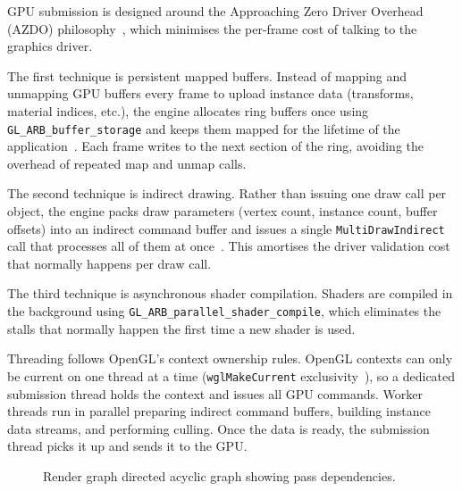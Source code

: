 \documentclass[9pt,openany]{extbook}
\begin{document}
GPU submission is designed around the Approaching Zero Driver Overhead (AZDO) philosophy~\cite{azdo_khronos}, which minimises the per-frame cost of talking to the graphics driver.

The first technique is persistent mapped buffers. Instead of mapping and unmapping GPU buffers every frame to upload instance data (transforms, material indices, etc.), the engine allocates ring buffers once using \texttt{GL\_ARB\_buffer\_storage} and keeps them mapped for the lifetime of the application~\cite{arb_buffer_storage}. Each frame writes to the next section of the ring, avoiding the overhead of repeated map and unmap calls.

The second technique is indirect drawing. Rather than issuing one draw call per object, the engine packs draw parameters (vertex count, instance count, buffer offsets) into an indirect command buffer and issues a single \texttt{MultiDrawIndirect} call that processes all of them at once~\cite{arb_multi_draw_indirect}. This amortises the driver validation cost that normally happens per draw call.

The third technique is asynchronous shader compilation. Shaders are compiled in the background using \texttt{GL\_ARB\_parallel\_shader\_compile}, which eliminates the stalls that normally happen the first time a new shader is used.

Threading follows OpenGL's context ownership rules. OpenGL contexts can only be current on one thread at a time (\texttt{wglMakeCurrent} exclusivity~\cite{wglMakeCurrent}), so a dedicated submission thread holds the context and issues all GPU commands. Worker threads run in parallel preparing indirect command buffers, building instance data streams, and performing culling. Once the data is ready, the submission thread picks it up and sends it to the GPU.

\begin{figure}[H]
\centering
{}
\caption{Render graph directed acyclic graph showing pass dependencies.}
\label{fig:render_graph}
\end{figure}
\end{document}
